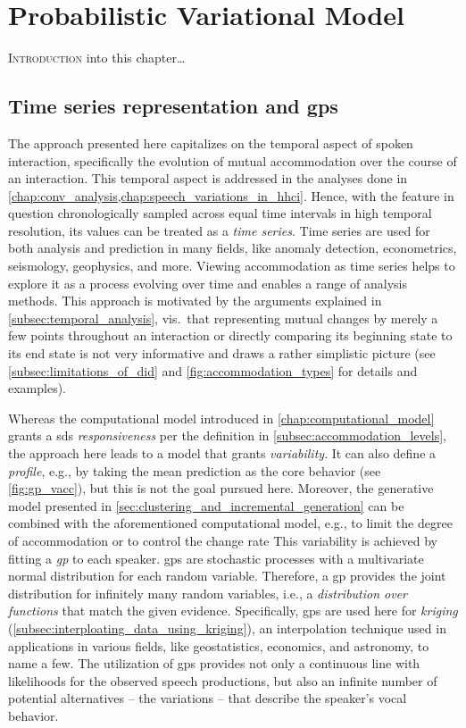 \chapter{Probabilistic Variational Model}
\label{chap:statistical_model}

\lettrine{I}{ntroduction} into this chapter\dots

\pagebreak

\section{Time series representation and \aclp{gp}}
\label{sec:time_series_analysis}

The approach presented here capitalizes on the temporal aspect of spoken interaction, specifically the evolution of mutual accommodation over the course of an interaction.
This temporal aspect is addressed in the analyses done in \cref{chap:conv_analysis,chap:speech_variations_in_hhci}.
Hence, with the feature in question chronologically sampled across equal time intervals in high temporal resolution, its values can be treated as a \emph{time series}.
Time series are used for both analysis and prediction in many fields, like anomaly detection, econometrics, seismology, geophysics, and more.
Viewing accommodation as time series helps to explore it as a process evolving over time and enables a range of analysis methods.
This approach is motivated by the arguments explained in \cref{subsec:temporal_analysis}, vis.\ that representing mutual changes by merely a few points throughout an interaction or directly comparing its beginning state to its end state is not very informative and draws a rather simplistic picture (see \cref{subsec:limitations_of_did} and \cref{fig:accommodation_types} for details and examples).

Whereas the computational model introduced in \cref{chap:computational_model} grants a \ac{sds} \emph{responsiveness} per the definition in \cref{subsec:accommodation_levels}, the approach here leads to a model that grants \emph{variability}.
It can also define a \emph{profile}, e.g., by taking the mean prediction as the core behavior (see \cref{fig:gp_vacc}), but this is not the goal pursued here.
Moreover, the generative model presented in \cref{sec:clustering_and_incremental_generation} can be combined with the aforementioned computational model, e.g., to limit the degree of accommodation or to control the change rate
This variability is achieved by fitting a \emph{\ac{gp}} to each speaker.
\Acp{gp} are stochastic processes with a multivariate normal distribution for each random variable.
Therefore, a \ac{gp} provides the joint distribution for infinitely many random variables, i.e., a \emph{distribution over functions} that match the given evidence.
Specifically, \acp{gp} are used here for \emph{kriging} (\cref{subsec:interploating_data_using_kriging}), an interpolation technique used in applications in various fields, like geostatistics, economics, and astronomy, to name a few.
The utilization of \acp{gp} provides not only a continuous line with likelihoods for the observed speech productions, but also an infinite number of potential alternatives -- the variations -- that describe the speaker's vocal behavior.

